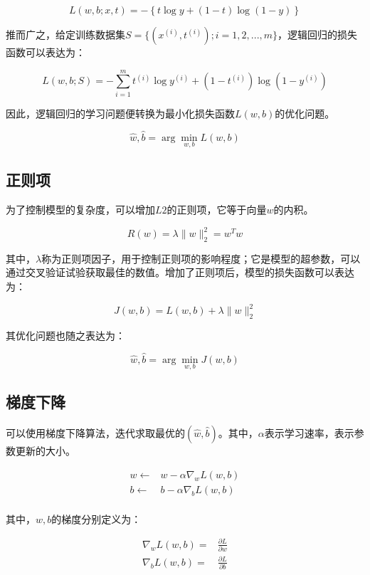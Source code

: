 \begin{content}
\[L(w,b;x,t) =  - \left\{ {t\log y + \left( {1 - t} \right)\log \left( {1 - y} \right)} \right\}\]

推而广之，给定训练数据集$ S = \{ ({x^{(i)}},{t^{(i)}});i = 1,2,...,m\} $，逻辑回归的损失函数可以表达为：

\[L(w,b; S) =  - \sum\limits_{i = 1}^m {{t^{(i)}}\log {y^{(i)}} + \left( {1 - {t^{(i)}}} \right)\log \left( {1 - {y^{(i)}}} \right)} \]

因此，逻辑回归的学习问题便转换为最小化损失函数$L(w,b)$的优化问题。

\[\hat w,\hat b = \arg \mathop {\min }\limits_{w,b} L(w, b)\]

\subsection{正则项}

为了控制模型的复杂度，可以增加$L2$的正则项，它等于向量$w$的内积。

\[R(w) = \lambda \parallel w\parallel _2^2 = {w^T}w \]

其中，$\lambda$称为正则项因子，用于控制正则项的影响程度；它是模型的超参数，可以通过交叉验证试验获取最佳的数值。增加了正则项后，模型的损失函数可以表达为：

\[J(w,b) = L(w,b) + \lambda \parallel w\parallel _2^2\]

其优化问题也随之表达为：

\[\hat w,\hat b = \arg \mathop {\min }\limits_{w,b} J(w, b)\]

\subsection{梯度下降}

可以使用梯度下降算法，迭代求取最优的$(\hat w,\hat b)$。其中，$\alpha$表示学习速率，表示参数更新的大小。

\[\begin{aligned}
  w \leftarrow & w - \alpha {\nabla _w}L(w,b) \\ 
  b \leftarrow & b - \alpha {\nabla _b}L(w,b) \\ 
\end{aligned} \]

其中，$w,b$的梯度分别定义为：

\[\begin{aligned}
  {\nabla _w}L(w,b) = & \frac{{\partial L}}{{\partial w}} \\ 
  {\nabla _b}L(w,b) = & \frac{{\partial L}}{{\partial b}} \\ 
\end{aligned} \]


\end{content}
